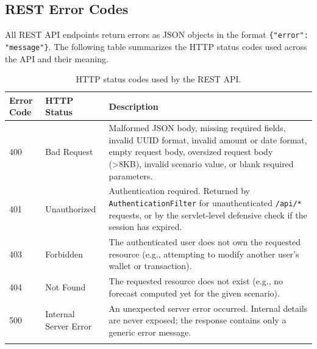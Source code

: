 \subsection{REST Error Codes}

All REST API endpoints return errors as JSON objects in the format \texttt{\{"error": "message"\}}. The following table summarizes the HTTP status codes used across the API and their meaning.

\begin{longtable}{|p{}|p{} |p{}|}
\hline
\textbf{Error Code} & \textbf{HTTP Status} & \textbf{Description} \\\hline

400 & Bad Request & Malformed JSON body, missing required fields, invalid UUID format, invalid amount or date format, empty request body, oversized request body (>8KB), invalid scenario value, or blank required parameters. \\\hline

401 & Unauthorized & Authentication required. Returned by \texttt{AuthenticationFilter} for unauthenticated \texttt{/api/*} requests, or by the servlet-level defensive check if the session has expired. \\\hline

403 & Forbidden & The authenticated user does not own the requested resource (e.g., attempting to modify another user's wallet or transaction). \\\hline

404 & Not Found & The requested resource does not exist (e.g., no forecast computed yet for the given scenario). \\\hline

500 & Internal Server Error & An unexpected server error occurred. Internal details are never exposed; the response contains only a generic error message. \\\hline

\caption{HTTP status codes used by the REST API.}
\label{tab:restErrorCodes}
\end{longtable}
